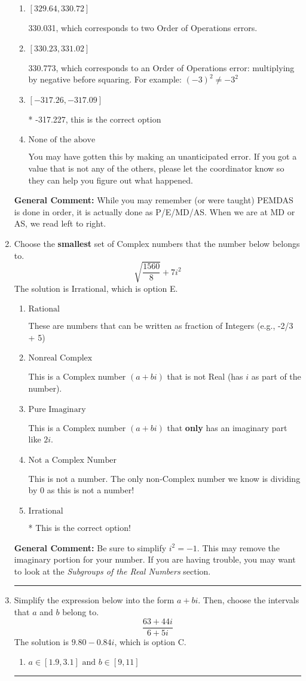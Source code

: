 \documentclass{extbook}[14pt]
\newcommand{\litem}[1]{\item #1

\rule{\textwidth}{0.4pt}}
\begin{document}
\begin{enumerate}
{\begin{enumerate}[label=\Alph*.]
 -317.969, which corresponds to an Order of Operations error: not reading left-to-right for multiplication/division.
\item \( [329.64, 330.72] \)

 330.031, which corresponds to two Order of Operations errors.
\item \( [330.23, 331.02] \)

 330.773, which corresponds to an Order of Operations error: multiplying by negative before squaring. For example: $(-3)^2 \neq -3^2$
\item \( [-317.26, -317.09] \)

* -317.227, this is the correct option
\item \( \text{None of the above} \)

 You may have gotten this by making an unanticipated error. If you got a value that is not any of the others, please let the coordinator know so they can help you figure out what happened.
\end{enumerate}

\textbf{General Comment:} While you may remember (or were taught) PEMDAS is done in order, it is actually done as P/E/MD/AS. When we are at MD or AS, we read left to right.
}
\litem{
Choose the \textbf{smallest} set of Complex numbers that the number below belongs to.
\[ \sqrt{\frac{1560}{8}}+7i^2 \]The solution is \( \text{Irrational} \), which is option E.\begin{enumerate}[label=\Alph*.]
\item \( \text{Rational} \)

These are numbers that can be written as fraction of Integers (e.g., -2/3 + 5)
\item \( \text{Nonreal Complex} \)

This is a Complex number $(a+bi)$ that is not Real (has $i$ as part of the number).
\item \( \text{Pure Imaginary} \)

This is a Complex number $(a+bi)$ that \textbf{only} has an imaginary part like $2i$.
\item \( \text{Not a Complex Number} \)

This is not a number. The only non-Complex number we know is dividing by 0 as this is not a number!
\item \( \text{Irrational} \)

* This is the correct option!
\end{enumerate}

\textbf{General Comment:} Be sure to simplify $i^2 = -1$. This may remove the imaginary portion for your number. If you are having trouble, you may want to look at the \textit{Subgroups of the Real Numbers} section.
}
\litem{
Simplify the expression below into the form $a+bi$. Then, choose the intervals that $a$ and $b$ belong to.
\[ \frac{63 + 44 i}{6 + 5 i} \]The solution is \( 9.80  - 0.84 i \), which is option C.\begin{enumerate}[label=\Alph*.]
\item \( a \in [1.9, 3.1] \text{ and } b \in [9, 11] \)


\end{enumerate}}
\end{enumerate}
\end{document}
